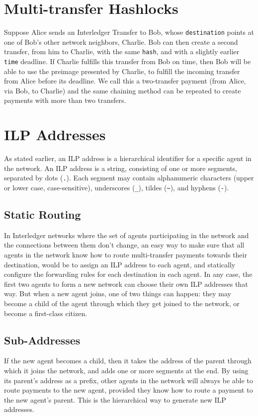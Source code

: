 \documentclass[11pt,twoside,a4paper]{article}
\begin{document}
\section{Multi-transfer Hashlocks}
Suppose Alice sends an Interledger Transfer to Bob, whose {\tt destination} points at one of Bob's other network neighbors, Charlie. Bob can then create a second
transfer, from him to Charlie, with the same {\tt hash}, and with a slightly earlier {\tt time} deadline. If Charlie fulfills this transfer from Bob on time, then Bob will be able
to use the preimage presented by Charlie, to fulfill the incoming transfer from Alice before its deadline. We call this a two-transfer payment (from Alice, via Bob, to Charlie) and the same
chaining method can be repeated to create payments with more than two transfers.

\section{ILP Addresses}
As stated earlier, an ILP address is a hierarchical identifier for a specific agent in the network.
An ILP address is a string, consisting of one or more segments, separated by dots ({\tt .}). Each segment may contain alphanumeric characters (upper or lower case, case-sensitive),
underscores ({\tt \_}),
tildes ({\tt \textasciitilde}),
and hyphens ({\tt -}).

\subsection{Static Routing}
In Interledger networks where the set of agents participating in the network and the connections between them don't change,
an easy way to make sure that all agents in the network know how to route multi-transfer payments towards their destination, would be to assign an ILP address to each agent, and statically configure the forwarding rules for each destination in each agent. In any case, the first two agents to form a new network can choose their own ILP addresses that way.
But when a new agent joins, one of two things can happen:
they may become a child of the agent through which they get joined to the network, or become a first-class citizen.

\subsection{Sub-Addresses}
If the new agent becomes a child, then it takes the address of the parent through which it joins the network, and adds one or more segments at the end. By using its parent's address as a
prefix, other agents in the network will always be able to route payments to the new agent, provided they know how to route a payment to the new agent's parent. This is the hierarchical
way to generate new ILP addresses.
\end{document}
